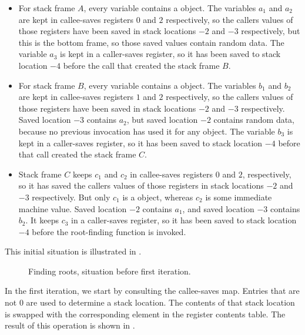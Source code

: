 \begin{itemize}
\item For stack frame $A$, every variable contains a \commonlisp{}
  object.  The variables $a_1$ and $a_2$ are kept in callee-saves
  registers $0$ and $2$ respectively, so the callers values of those
  registers have been saved in stack locations $-2$ and $-3$
  respectively, but this is the bottom frame, so those saved values
  contain random data.  The variable $a_3$ is kept in a caller-saves
  register, so it has been saved to stack location $-4$ before the
  call that created the stack frame $B$.
\item For stack frame $B$, every variable contains a \commonlisp{}
  object.  The variables $b_1$ and $b_2$ are kept in callee-saves
  registers $1$ and $2$ respectively, so the callers values of those
  registers have been saved in stack locations $-2$ and $-3$
  respectively.  Saved location $-3$ contains $a_2$, but saved
  location $-2$ contains random data, because no previous invocation
  has used it for any \commonlisp{} object.  The variable $b_3$ is
  kept in a caller-saves register, so it has been saved to stack
  location $-4$ before that call created the stack frame $C$.
\item Stack frame $C$ keeps $c_1$ and $c_2$ in callee-saves registers
  $0$ and $2$, respectively, so it has saved the callers values of
  those registers in stack locations $-2$ and $-3$ respectively.  But
  only $c_1$ is a \commonlisp{} object, whereas $c_2$ is some immediate
  machine value.  Saved location $-2$ contains $a_1$, and saved
  location $-3$ contains $b_2$.  It keeps $c_3$ in a caller-saves
  register, so it has been saved to stack location $-4$ before the
  root-finding function is invoked.
\end{itemize}

This initial situation is illustrated in
.

\begin{figure}
\begin{center}
\end{center}
\caption{\label{fig-root-finding-example-1}
Finding roots, situation before first iteration.}
\end{figure}

In the first iteration, we start by consulting the callee-saves map.
Entries that are not $0$ are used to determine a stack location.  The
contents of that stack location is swapped with the corresponding
element in the register contents table.  The result of this operation
is shown in .

